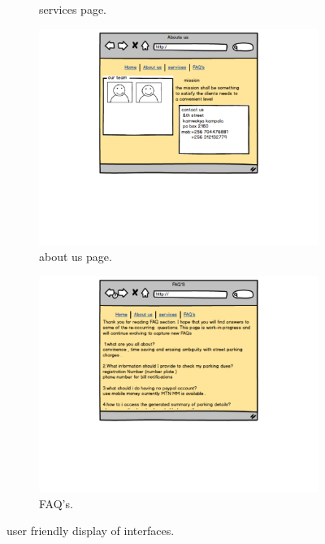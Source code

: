 \documentclass[12pt]{article}
\begin{document}
\begin{figure}[h!]
\begin{subfigure}[b]{0.4\linewidth}
    \caption{services page.}
  \end{subfigure}
  \begin{subfigure}[b]{0.4\linewidth}
    \includegraphics[width=\linewidth]{aboutus.pdf}
    \caption{about us page.}
  \end{subfigure}
  \begin{subfigure}[b]{0.4\linewidth}
    \includegraphics[width=\linewidth]{FAQ's.jpg}
    \caption{FAQ's.}
  \end{subfigure}
  \caption{user friendly display of interfaces.}
  \label{fig:3}
\end{figure}
\end{document}
